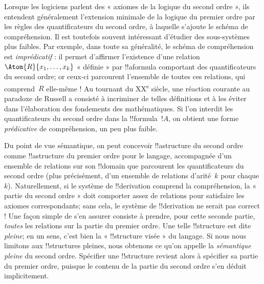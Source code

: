 \documentclass[../../../include/open-logic-section]{subfiles}
\begin{document}
Lorsque les logiciens parlent des « axiomes de la logique du second
ordre », ils entendent généralement l'extension minimale de la
logique du premier ordre par les règles des quantificateurs du second
ordre, à laquelle s'ajoute le schéma de compréhension. Il est
toutefois souvent intéressant d'étudier des sous-systèmes plus
faibles. Par exemple, dans toute sa généralité, le schéma de
compréhension est \emph{imprédicatif} : il permet d'affirmer
l'existence d'une relation $\Atom{R}{x_1, \dots, x_k}$
« définie » par !!a{formula} comportant des quantificateurs du
second ordre; or ceux-ci parcourent l'ensemble de toutes ces
relations, qui comprend~$R$ elle-même !{} Au tournant du
XX\textsuperscript{e} siècle, une réaction courante au paradoxe de
Russell a consisté à incriminer de telles définitions et à les éviter
dans l'élaboration des fondements des mathématiques. Si l'on interdit
les quantificateurs du second ordre dans la !!{formula}~$!A$, on
obtient une forme {\em prédicative} de compréhension, un peu plus
faible.

Du point de vue sémantique, on peut concevoir !!a{structure} du
second ordre comme !!a{structure} du premier ordre pour le langage,
accompagnée d'un ensemble de relations sur son !!{domain} que
parcourent les quantificateurs du second ordre (plus précisément,
d'un ensemble de relations d'arité~$k$ pour chaque $k$).
Naturellement, si le système de !!{derivation} comprend la
compréhension, la « partie du second ordre » doit comporter assez
de relations pour satisfaire les axiomes correspondants; sans cela,
le système de !!{derivation} ne serait pas correct !{} Une façon
simple de s'en assurer consiste à prendre, pour cette seconde partie,
\emph{toutes} les relations sur la partie du premier ordre. Une
telle !!{structure} est dite \emph{pleine}; en un sens, c'est bien
la « !!{structure} visée » du langage. Si nous nous limitons aux
!!{structure}s pleines, nous obtenons ce qu'on appelle la
\emph{sémantique pleine} du second ordre. Spécifier une
!!{structure} revient alors à spécifier sa partie du premier ordre,
puisque le contenu de la partie du second ordre s'en déduit
implicitement.
\end{document}
